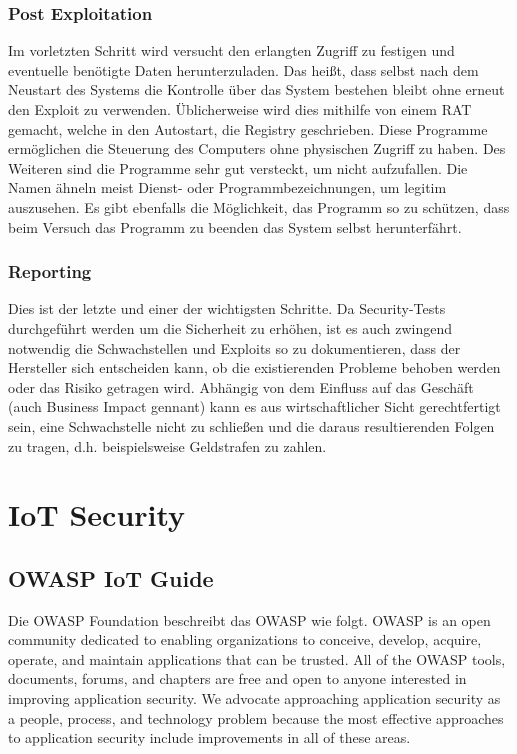     \subsubsection{\glqq Post Exploitation\grqq{}}
        Im vorletzten Schritt wird versucht den erlangten Zugriff zu festigen und eventuelle benötigte Daten herunterzuladen. Das heißt, dass selbst nach dem Neustart des Systems die Kontrolle über das System bestehen bleibt ohne erneut den Exploit zu verwenden. Üblicherweise wird dies mithilfe von einem \ac{RAT} gemacht, welche in den Autostart, die Registry geschrieben. Diese Programme ermöglichen die Steuerung des Computers ohne physischen Zugriff zu haben. Des Weiteren sind die Programme sehr gut versteckt, um nicht aufzufallen. Die Namen ähneln meist Dienst- oder Programmbezeichnungen, um legitim auszusehen. Es gibt ebenfalls die Möglichkeit, das Programm so zu schützen, dass beim Versuch das Programm zu beenden das System selbst herunterfährt.
    \subsubsection{\glqq Reporting\grqq{}}
        Dies ist der letzte und einer der wichtigsten Schritte. Da Security-Tests durchgeführt werden um die Sicherheit zu erhöhen, ist es auch zwingend notwendig die Schwachstellen und Exploits so zu dokumentieren, dass der Hersteller sich entscheiden kann, ob die existierenden Probleme behoben werden oder das Risiko getragen wird. Abhängig von dem Einfluss auf das Geschäft (auch \glqq Business Impact\grqq{} gennant) kann es aus wirtschaftlicher Sicht gerechtfertigt sein, eine Schwachstelle nicht zu schließen und die daraus resultierenden Folgen zu tragen, d.h. beispielsweise Geldstrafen zu zahlen.

\section{IoT Security} \label{IoTSecurity}
    \subsection{OWASP IoT Guide}
        Die OWASP Foundation \cite{guzman_2019} beschreibt das \ac{OWASP} wie folgt.
        \glqq OWASP is an open community dedicated to enabling organizations to conceive, develop, acquire, operate, and maintain applications that can be trusted. All of the OWASP tools, documents, forums, and chapters are free and open to anyone interested in improving application security. We advocate approaching application security as a people, process, and technology problem because the most effective approaches to application security include improvements in all of these areas.\grqq{}
        
